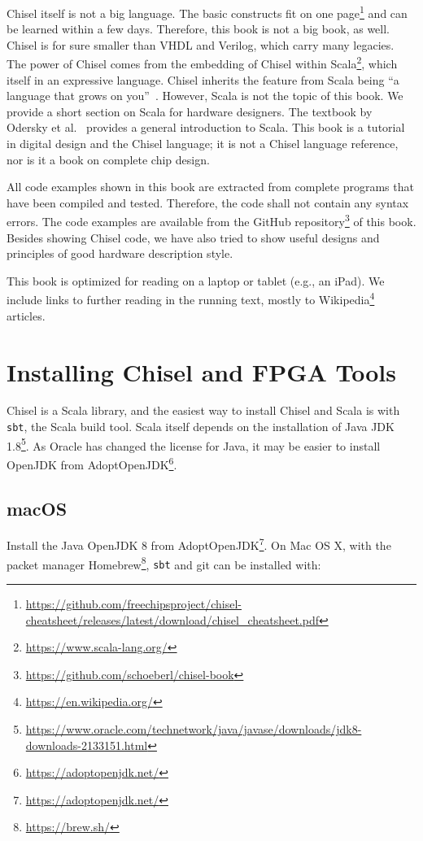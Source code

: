 \documentclass[%
    10pt,
    headinclude, footexclude,
    openright, %
    notitlepage,
    cleardoubleempty,
    headsepline,
    pointlessnumbers,
    bibtotoc, idxtotoc,
    ]{scrbook}
\newcommand{\code}[1]{{\small{\texttt{#1}}}}
\newcommand{\myref}[2]{\href{#1}{#2}}
\renewcommand{\myref}[2]{{#2}{\footnote{\url{#1}}}}
\begin{document}
Chisel itself is not a big language. The basic constructs fit on
\myref{https://github.com/freechipsproject/chisel-cheatsheet/releases/latest/download/chisel_cheatsheet.pdf}{one page}
and can be learned within a few days.
Therefore, this book is not a big book, as well.
Chisel is for sure smaller than VHDL and Verilog, which carry many legacies.
The power of Chisel comes from the embedding of Chisel within
\myref{https://www.scala-lang.org/}{Scala}, which itself in an expressive language.
Chisel inherits the feature from Scala being ``a language that grows on you''~\cite{Scala}.
However, Scala is not the topic of this book.
We provide a short section on Scala for hardware designers.
The textbook by Odersky et al.~\cite{Scala} provides a general introduction
to Scala.
This book is a tutorial in digital design and the Chisel language; it is not
a Chisel language reference, nor is it a book on complete chip design.


All code examples shown in this book are extracted from complete programs
that have been compiled and tested. Therefore, the code shall not contain
any syntax errors. The code examples are available from the
\myref{https://github.com/schoeberl/chisel-book}{GitHub repository}
of this book.
Besides showing Chisel code, we have also tried to show useful designs and
principles of good hardware description style.

This book is optimized for reading on a laptop or tablet (e.g., an iPad).
We include links to further reading in the running text, mostly to
\myref{https://en.wikipedia.org/}{Wikipedia} articles.

\section{Installing Chisel and FPGA Tools}

Chisel is a Scala library, and the easiest way to install Chisel and Scala is
with \code{sbt}, the Scala build tool. Scala itself depends on the installation
of \myref{https://www.oracle.com/technetwork/java/javase/downloads/jdk8-downloads-2133151.html}{Java JDK 1.8}. As Oracle has changed the license for Java, it may be easier to
install OpenJDK from \myref{https://adoptopenjdk.net/}{AdoptOpenJDK}.

\subsection{macOS}

Install the Java OpenJDK 8 from \myref{https://adoptopenjdk.net/}{AdoptOpenJDK}.
On Mac OS X, with the packet manager \myref{https://brew.sh/}{Homebrew},
\code{sbt} and git can be installed with:
\end{document}
